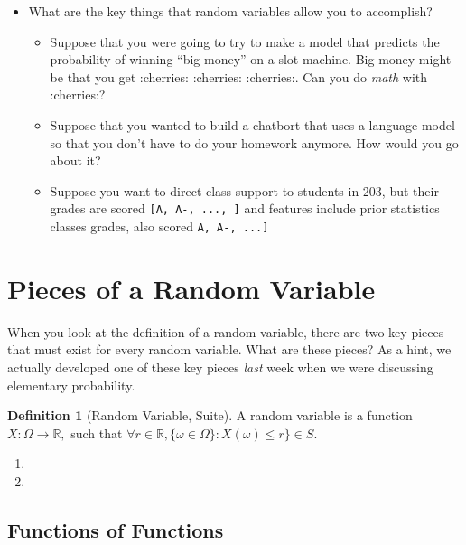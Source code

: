 \documentclass[
]{book}
\providecommand{\tightlist}{%
  \setlength{\itemsep}{0pt}\setlength{\parskip}{0pt}}
\theoremstyle{definition}
\newtheorem{definition}{Definition}[chapter]
\theoremstyle{definition}
\theoremstyle{definition}
\theoremstyle{definition}
\theoremstyle{remark}
\begin{document}
\begin{itemize}
\tightlist
\item
  What are the key things that random variables allow you to accomplish?

  \begin{itemize}
  \tightlist
  \item
    Suppose that you were going to try to make a model that predicts the probability of winning ``big money'' on a slot machine. Big money might be that you get :cherries: :cherries: :cherries:. Can you do \emph{math} with :cherries:?
  \item
    Suppose that you wanted to build a chatbort that uses a language model so that you don't have to do your homework anymore. How would you go about it?
  \item
    Suppose you want to direct class support to students in 203, but their grades are scored \texttt{{[}A,\ A-,\ ...,\ {]}} and features include prior statistics classes grades, also scored \texttt{A,\ A-,\ ...{]}}
  \end{itemize}
\end{itemize}

\hypertarget{pieces-of-a-random-variable}{%
\section{Pieces of a Random Variable}\label{pieces-of-a-random-variable}}

When you look at the definition of a random variable, there are two key pieces that must exist for every random variable. What are these pieces? As a hint, we actually developed one of these key pieces \emph{last} week when we were discussing elementary probability.

\begin{definition}[Random Variable, Suite]
A random variable is a function \(X : \Omega \rightarrow \mathbb{R},\) such that \(\forall r \in \mathbb{R}, \{\omega \in \Omega\}: X(\omega) \leq r\} \in S\).
\end{definition}

\begin{enumerate}
\def\labelenumi{\arabic{enumi}.}
\tightlist
\item
\item
\end{enumerate}

\hypertarget{functions-of-functions}{%
\subsection{Functions of Functions}\label{functions-of-functions}}
\end{document}
